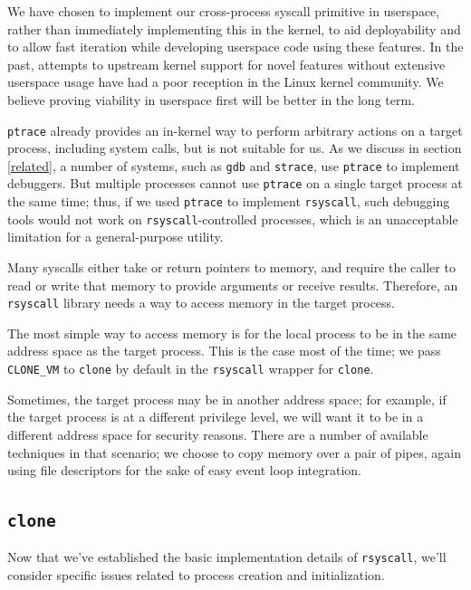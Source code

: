 \documentclass[letterpaper,twocolumn,10pt]{article}
\begin{document}
We have chosen to implement our cross-process syscall primitive in userspace,
rather than immediately implementing this in the kernel,
to aid deployability
and to allow fast iteration while developing userspace code using these features.
In the past, attempts to upstream kernel support for novel features without extensive userspace usage
have had a poor reception in the Linux kernel community\cite{lwn_checkpoint}\cite{first_class_address_space}.
We believe proving viability in userspace first will be better in the long term.

\texttt{ptrace} already provides an in-kernel way to perform arbitrary actions on a target process,
including system calls,
but is not suitable for us\cite{ptrace}.
As we discuss in section \ref{related}, a number of systems, such as \texttt{gdb} and \texttt{strace},
use \texttt{ptrace} to implement debuggers.
But multiple processes cannot use \texttt{ptrace} on a single target process at the same time;
thus, if we used \texttt{ptrace} to implement \texttt{rsyscall},
such debugging tools would not work on \texttt{rsyscall}-controlled processes,
which is an unacceptable limitation for a general-purpose utility.

Many syscalls either take or return pointers to memory,
and require the caller to read or write that memory to provide arguments or receive results.
Therefore, an \texttt{rsyscall} library needs a way to access memory in the target process.

The most simple way to access memory is for the local process to be in the same address space as the target process.
This is the case most of the time; we pass \verb|CLONE_VM| to \texttt{clone} by default
in the \texttt{rsyscall} wrapper for \texttt{clone}.

Sometimes, the target process may be in another address space;
for example, if the target process is at a different privilege level,
we will want it to be in a different address space for security reasons\cite{vfork_dangerous}.
There are a number of available techniques in that scenario;
we choose to copy memory over a pair of pipes,
again using file descriptors for the sake of easy event loop integration.
\subsection{\texttt{clone}}\label{clone}
Now that we've established the basic implementation details of \texttt{rsyscall},
we'll consider specific issues related to process creation and initialization.
\end{document}
